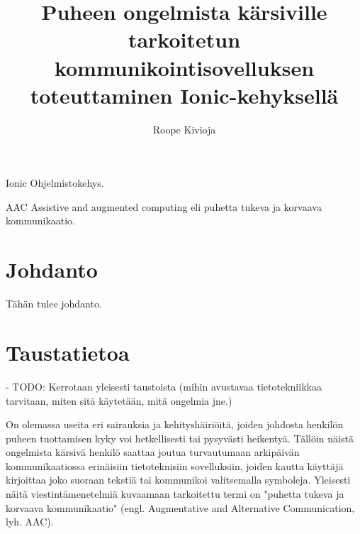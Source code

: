 \documentclass[utf8]{gradu3}
\begin{document}
\title{Puheen ongelmista kärsiville tarkoitetun kommunikointisovelluksen toteuttaminen Ionic-kehyksellä}

\author{Roope Kivioja}


\maketitle

\begin{thetermlist}
\item[Ionic] Ohjelmistokehys.
\item[AAC] Assistive and augmented computing eli puhetta tukeva ja korvaava kommunikaatio.
\end{thetermlist}

\mainmatter

\chapter{Johdanto}

Tähän tulee johdanto.

\chapter{Taustatietoa}

- TODO: Kerrotaan yleisesti taustoista (mihin avustavaa tietotekniikkaa tarvitaan, miten sitä käytetään, mitä ongelmia jne.)

On olemassa useita eri sairauksia ja kehityshäiriöitä, joiden johdosta henkilön puheen tuottamisen kyky voi hetkellisesti tai pysyvästi heikentyä. Tällöin näistä ongelmista kärsivä henkilö saattaa joutua turvautumaan arkipäivän kommunikaatiossa erinäisiin tietoteknisiin sovelluksiin, joiden kautta käyttäjä kirjoittaa joko suoraan tekstiä tai kommunikoi valitsemalla symboleja. Yleisesti näitä viestintämenetelmiä kuvaamaan tarkoitettu termi on "puhetta tukeva ja korvaava kommunikaatio" (engl. Augmentative and Alternative Communication, lyh. AAC).
\end{document}
